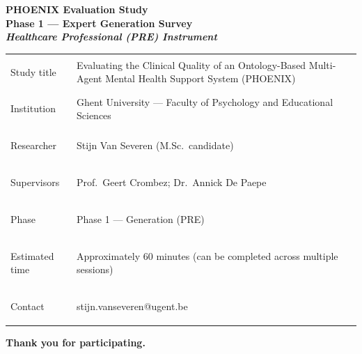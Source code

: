 \documentclass[11pt,a4paper]{article}
\renewcommand{\arraystretch}{1.30}
\begin{document}
\begin{titlepage}
\centering\vspace*{0.8cm}

\begin{tcolorbox}[
  colback=DarkBlue,colframe=DarkBlue,
  arc=3mm,left=14pt,right=14pt,top=12pt,bottom=12pt,
  width=\textwidth
]
\centering
{\fontsize{22}{28}\selectfont\bfseries\color{white}
PHOENIX Evaluation Study\\[0.3em]
\fontsize{15}{20}\selectfont\color{AccentBlue}
Phase 1 --- Expert Generation Survey\\[0.2em]
\fontsize{12}{16}\selectfont\color{white}
\textit{Healthcare Professional (PRE) Instrument}
}
\end{tcolorbox}

\vspace{0.9cm}

\begin{tcolorbox}[
  colback=SoftBG,colframe=BorderGrey,
  arc=2mm,left=10pt,right=10pt,top=9pt,bottom=9pt,
  width=0.90\textwidth
]
\small\renewcommand{\arraystretch}{1.30}
\begin{tabularx}{\textwidth}{@{}>{\bfseries\raggedright}p{}X@{}}
Study title   & Evaluating the Clinical Quality of an Ontology-Based Multi-Agent Mental Health Support System (PHOENIX) \\
Institution   & Ghent University --- Faculty of Psychology and Educational Sciences \\
Researcher    & Stijn Van Severen (M.Sc.\ candidate) \\
Supervisors   & Prof.\ Geert Crombez; Dr.\ Annick De Paepe \\
Phase         & Phase 1 --- Generation (PRE) \\
Estimated time & Approximately 60 minutes (can be completed across multiple sessions) \\
Contact       & stijn.vanseveren@ugent.be \\
\end{tabularx}
\end{tcolorbox}

\vspace{0.7cm}

\begin{tcolorbox}[
  colback=AccentBlue,colframe=PrimaryBlue,
  arc=2mm,left=10pt,right=10pt,top=9pt,bottom=9pt,
  width=0.88\textwidth
]
\textbf{\color{PrimaryBlue}Thank you for participating.}


\end{tcolorbox}
\end{titlepage}
\end{document}
